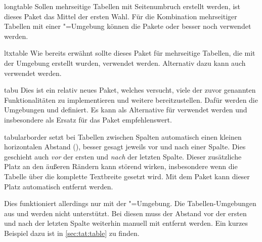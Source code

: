 \documentclass[%
  english,ngerman,%
  headings=optiontoheadandtoc,captions=tableheading,numbers=noenddot,%
  chapterpage,cdfoot,%
]{tudscrman}
\begin{document}
\begin{packages}
\item[longtable]
  Sollen mehrseitige Tabellen mit Seitenumbruch erstellt werden, ist dieses 
  Paket das Mittel der ersten Wahl. Für die Kombination mehrseitiger Tabellen mit
  einer "=Umgebung können die Pakete  
  oder besser noch  verwendet werden.
\item[ltxtable]
  Wie bereits erwähnt sollte dieses Paket für mehrseitige Tabellen, die mit der 
  Umgebung  erstellt wurden, verwendet werden. Alternativ 
  dazu kann auch  verwendet werden.
\item[tabu]
  Dies ist ein relativ neues Paket, welches versucht, viele der zuvor genannten 
  Funktionalitäten zu implementieren und weitere bereitzustellen. Dafür werden 
  die Umgebungen  und  definiert. Es 
  kann als Alternative für  verwendet werden und insbesondere 
  als Ersatz für das Paket  empfehlenswert.
\item[tabularborder]
   setzt bei Tabellen zwischen Spalten automatisch einen kleinen 
  horizontalen Abstand (), besser gesagt jeweils vor und nach 
  einer Spalte. Dies geschieht auch \emph{vor} der ersten und \emph{nach} der 
  letzten Spalte. Dieser zusätzliche Platz an den äußeren Rändern kann störend 
  wirken, insbesondere wenn die Tabelle über die komplette Textbreite gesetzt 
  wird. Mit dem Paket  kann dieser Platz automatisch 
  entfernt werden.
  
  Dies funktioniert allerdings nur mit der "=Umgebung. Die 
  Tabellen-Umgebungen aus  und  werden nicht 
  unterstützt. Bei diesen muss der Abstand vor der ersten und nach der letzten 
  Spalte weiterhin manuell mit \PParameter{} entfernt werden. Ein 
  kurzes Beispiel dazu ist in \autoref{sec:tat:table} zu finden.
\end{packages}
\end{document}
